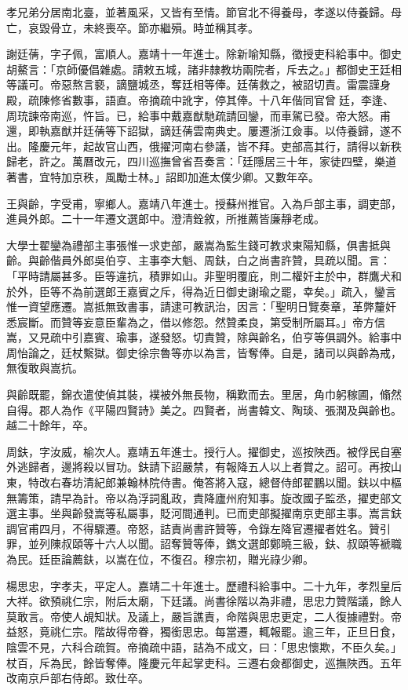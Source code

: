 \begin{pinyinscope}
{{孝兄弟分居南北臺，並著風采，又皆有至情。節官北不得養母，孝遂以侍養歸。母亡，哀毀骨立，未終喪卒。節亦繼殞。時並稱其孝。

謝廷蒨，字子佩，富順人。嘉靖十一年進士。除新喻知縣，徵授吏科給事中。御史胡鰲言：「京師優倡雜處。請敕五城，諸非隸教坊兩院者，斥去之。」都御史王廷相等議可。帝惡熬言褻，謫鹽城丞，奪廷相等俸。廷蒨救之，被詔切責。雷震謹身殿，疏陳修省數事，語直。帝摘疏中訛字，停其俸。十八年偕同官曾廷，李逢、周珫諫帝南巡，忤旨。已，給事中戴嘉猷馳疏請回鑾，而車駕已發。帝大怒。甫還，即執嘉猷并廷蒨等下詔獄，謫廷蒨雲南典史。屢遷浙江僉事。以侍養歸，遂不出。隆慶元年，起故官山西，俄擢河南右參議，皆不拜。吏部高其行，請得以新秩歸老，許之。萬曆改元，四川巡撫曾省吾奏言：「廷隱居三十年，家徒四壁，樂道著書，宜特加京秩，風勵士林。」詔即加進太僕少卿。又數年卒。

王與齡，字受甫，寧鄉人。嘉靖八年進士。授蘇州推官。入為戶部主事，調吏部，進員外郎。二十一年遷文選郎中。澄清銓敘，所推薦皆廉靜老成。

大學士翟鑾為禮部主事張惟一求吏部，嚴嵩為監生錢可教求東陽知縣，俱書抵與齡。與齡偕員外郎吳伯亨、主事李大魁、周鈇，白之尚書許贊，具疏以聞。言：「平時請屬甚多。臣等違抗，積罪如山。非聖明覆庇，則二權奸主於中，群鷹犬和於外，臣等不為前選郎王嘉賓之斥，得為近日御史謝瑜之罷，幸矣。」疏入，鑾言惟一資望應遷。嵩抵無致書事，請逮可教訊治，因言：「聖明日覽奏章，革弊釐奸悉宸斷。而贊等妄意臣輩為之，借以修怨。然贊柔良，第受制所屬耳。」帝方信嵩，又見疏中引嘉賓、瑜事，遂發怒。切責贊，除與齡名，伯亨等俱調外。給事中周怡論之，廷杖繫獄。御史徐宗魯等亦以為言，皆奪俸。自是，諸司以與齡為戒，無復敢與嵩抗。

與齡既罷，錦衣遣使偵其裝，襆被外無長物，稱歎而去。里居，角巾躬稼圃，翛然自得。郡人為作《平陽四賢詩》美之。四賢者，尚書韓文、陶琰、張潤及與齡也。越二十餘年，卒。

周鈇，字汝威，榆次人。嘉靖五年進士。授行人。擢御史，巡按陜西。被俘民自塞外逃歸者，邊將殺以冒功。鈇請下詔嚴禁，有報降五人以上者賞之。詔可。再按山東，特改右春坊清紀郎兼翰林院侍書。俺答將入寇，總督侍郎翟鵬以聞。鈇以中樞無籌策，請早為計。帝以為浮詞亂政，責降廬州府知事。旋改國子監丞，擢吏部文選主事。坐與齡發嵩等私屬事，貶河間通判。已而吏部擬擢南京吏部主事。嵩言鈇調官甫四月，不得驟遷。帝怒，詰責尚書許贊等，令錄左降官遷擢者姓名。贊引罪，並列陳叔頤等十六人以聞。詔奪贊等俸，鐫文選郎鄭曉三級，鈇、叔頤等褫職為民。廷臣論薦鈇，以嵩在位，不復召。穆宗初，贈光祿少卿。

楊思忠，字孝夫，平定人。嘉靖二十年進士。歷禮科給事中。二十九年，孝烈皇后大祥。欲預祧仁宗，附后太廟，下廷議。尚書徐階以為非禮，思忠力贊階議，餘人莫敢言。帝使人覘知狀。及議上，嚴旨譙責，命階與思忠更定，二人復據禮對。帝益怒，竟祧仁宗。階故得帝眷，獨銜思忠。每當遷，輒報罷。逾三年，正旦日食，陰雲不見，六科合疏賀。帝摘疏中語，詰為不成文，曰：「思忠懷欺，不臣久矣。」杖百，斥為民，餘皆奪俸。隆慶元年起掌吏科。三遷右僉都御史，巡撫陜西。五年改南京戶部右侍郎。致仕卒。

}}
\end{pinyinscope}
